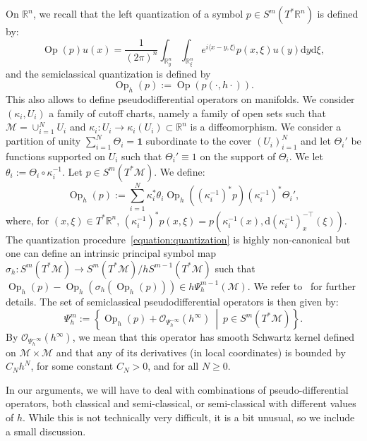 \documentclass[AHL,Unicode,longabstracts,published]{cedram}
\newcommand{\R}{\mathbb{R}}
\newcommand{\bfun}{\mathbf{1}}
\newcommand{\mc}{\mathcal}
\newcommand{\M}{\mathcal{M}}
\newcommand{\dd}{\mathrm{d}}
\DeclareMathOperator{\Op}{Op}
\begin{document}
On $\R^n$, we recall that the left quantization of a symbol $p \in S^m(T^*\R^n)$ is defined by:
\[
\Op(p)u(x) = \frac{1}{(2\pi)^n}\int_{\R^n_y} \int_{\R^n_\xi} e^{i \langle x-y,\xi\rangle} p\left(x,\xi\right) u(y) \dd y \dd \xi,
\]
and the semiclassical quantization is defined by
\[
\Op_h(p) := \Op(p(\cdot, h\cdot)).
\]
This also allows to define pseudodifferential operators on manifolds. We consider $(\kappa_i,U_i)$ a family of cutoff charts, namely a family of open sets such that $\M = \cup_{i=1}^N U_i$ and $\kappa_i : U_i \rightarrow \kappa_i(U_i) \subset \R^n$ is a diffeomorphism. We consider a partition of unity $\sum_{i=1}^N \Theta_i = \bfun$ subordinate to the cover $(U_i)_{i=1}^N$ and let $\Theta_i'$ be functions supported on $U_i$ such that $\Theta_i' \equiv 1$ on the support of $\Theta_i$. We let $\theta_i := \Theta_i \circ \kappa_i^{-1}$. Let $p \in S^m(T^*\M)$. We define:
\begin{equation}\label{equation:quantization}
\Op_h(p) := \sum_{i=1}^N \kappa_i^*\theta_i \Op_h\left(\left(\kappa_i^{-1}\right)^*p\right) \left(\kappa_i^{-1}\right)^*\Theta_i',
\end{equation}
where, for $(x,\xi) \in T^*\R^n$, $(\kappa_i^{-1})^*p(x,\xi) = p(\kappa_i^{-1}(x), \dd (\kappa_i^{-1})^{-\top}_x(\xi))$. The quantization procedure~\eqref{equation:quantization} is highly non-canonical but one can define an intrinsic principal symbol map $\sigma_h : S^m(T^*\M) \rightarrow S^m(T^*\M)/hS^{m-1}(T^*\M)$ such that $\Op_h(p) - \Op_h(\sigma_h(\Op_h(p))) \in h \Psi^{m-1}_h(\M)$. We refer to~\cite[Appendix~E]{Dyatlov-Zworski-19} for further details. The set of semiclassical pseudodifferential operators is then given by:
\[
\Psi^m_h := \left\{ \Op_h(p) + \mc{O}_{\Psi^{-\infty}_h}(h^\infty)~\middle|~p \in S^m(T^*\M)\right\}.
\]
By $\mc{O}_{\Psi^{-\infty}_h}(h^\infty)$, we mean that this operator has smooth Schwartz kernel defined on $\M \times \M$ and that any of its derivatives (in local coordinates) is bounded by $C_N h^N$, for some constant $C_N > 0$, and for all $N \geq 0$.

In our arguments, we will have to deal with combinations of pseudo-differential operators, both classical and semi-classical, or semi-classical with different values of $h$. While this is not technically very difficult, it is a bit unusual, so we include a small discussion.
\end{document}
